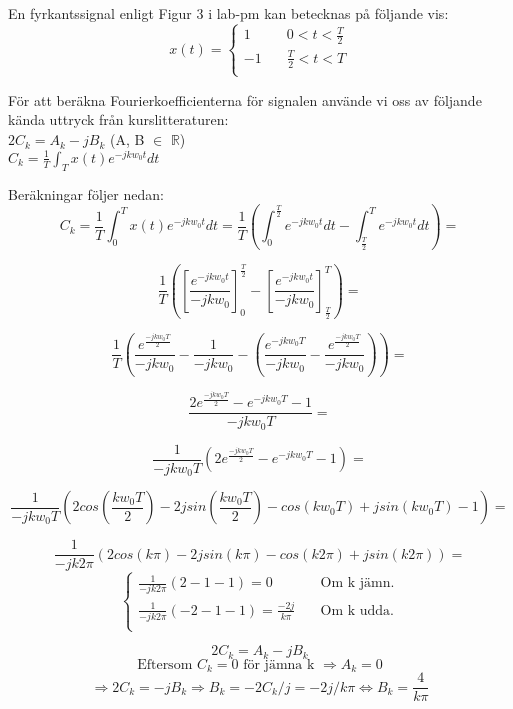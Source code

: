 En fyrkantssignal enligt Figur 3 i lab-pm kan betecknas på följande vis:
\[ 
  x(t) =  
    \begin{cases} 
        1   &   \quad 0 < t < \frac{T}{2}\\ 
        -1  &   \quad \frac{T}{2} < t < T\\ 
    \end{cases} 
\] 

För att beräkna Fourierkoefficienterna för signalen använde vi oss av följande
kända uttryck från kurslitteraturen:\\
$2C_k = A_k - jB_k$ (A, B $\in$ $\mathbb{R}$) \\ %
$C_k = \frac{1}{T} \int_T x(t)e^{-jkw_{0}t}dt$

Beräkningar följer nedan:
$$ C_k = \frac{1}{T} \int_0^T x(t)e^{-jkw_{0}t}dt = 
\frac{1}{T} \left(\int_0^{\frac{T}{2}} e^{-jkw_{0}t}dt - 
\int_{\frac{T}{2}}^T e^{-jkw_{0}t} dt\right) =$$

$$\frac{1}{T} \left(\left[\frac{e^{-jkw_{0}t}}{-jkw_{0}}\right]_0^{\frac{T}{2}} - 
\left[\frac{e^{-jkw_{0}t}}{-jkw_{0}}\right]_{\frac{T}{2}}^T\right) = $$ 


$$\frac{1}{T} \left(\frac{e^{\frac{-jkw_{0}T}{2}}}{-jkw_{0}} - 
\frac{1}{-jkw_{0}} - \left(\frac{e^{-jkw_{0}T}}{-jkw_{0}} - 
\frac{e^{\frac{-jkw_{0}T}{2}}}{-jkw_{0}}\right)\right) = $$


$$\frac{2e^{\frac{-jkw_{0}T}{2}} - e^{-jkw_{0}T} - 1}{-jkw_{0}T} = $$


$$\frac{1}{-jkw_{0}T}\left(2e^{\frac{-jkw_{0}T}{2}} - e^{-jkw_{0}T} - 1\right) =$$

$$\frac{1}{-jkw_{0}T}\left(2cos\left(\frac{kw_{0}T}{2}\right) - 
2jsin\left(\frac{kw_{0}T}{2}\right) - cos\left(kw_{0}T\right) +
jsin\left(kw_{0}T\right) -1\right) =$$ 

$$\frac{1}{-jk2\pi}(2cos(k\pi) - 2jsin(k\pi) - cos(k2\pi) + jsin(k2\pi)) =$$
$$\begin{cases} 
        \frac{1}{-jk2\pi}(2-1-1)= 0 &   \quad \text{Om k jämn.} \\ 
        \frac{1}{-jk2\pi}(-2-1-1)= \frac{-2j}{k\pi} & \quad \text{Om k udda.}\\ 
\end{cases} 
$$ 

$$2C_k = A_k - jB_k $$
$$\text{Eftersom $C_k = 0$ för jämna k } \Rightarrow A_k = 0$$
$$\Rightarrow 2C_k = -jB_k \Rightarrow B_k = -2C_k/j = -2j/k\pi \Leftrightarrow
B_k = \frac{4}{k\pi}$$
